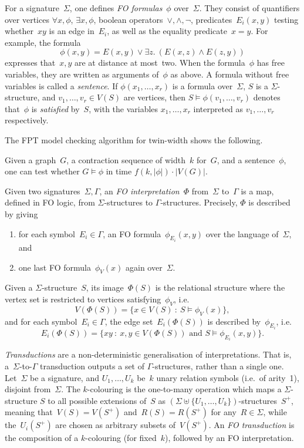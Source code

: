 \documentclass[a4paper,UKenglish,cleveref,thm-restate]{lipics-v2021}
\theoremstyle{remark}
\begin{document}
For a signature~$\Sigma$, one defines \emph{FO formulas}~$\phi$ over~$\Sigma$.
They consist of quantifiers over vertices $\forall x,\phi$, $\exists x,\phi$, boolean operators~$\lor,\land,\lnot$,
predicates~$E_i(x,y)$ testing whether~$xy$ is an edge in~$E_i$, as well as the equality predicate~$x=y$.
For example, the formula
\[ \phi(x,y) = E(x,y) \lor \exists z.\ (E(x,z) \land E(z,y)) \]
expresses that~$x,y$ are at distance at most~two.
When the formula~$\phi$ has free variables, they are written as arguments of~$\phi$ as above.
A formula without free variables is called a \emph{sentence}.
If $\phi(x_1,\dots,x_r)$ is a formula over~$\Sigma$, $S$ is a $\Sigma$-structure, and $v_1,\dots,v_r \in V(S)$ are vertices,
then $S \models \phi(v_1,\dots,v_r)$ denotes that~$\phi$ is \emph{satisfied} by~$S$, with the variables $x_1,\dots,x_r$ interpreted as $v_1,\dots,v_r$ respectively.

The FPT model checking algorithm for twin-width shows the following.
\begin{theorem}\label{thm:model-checking}
    Given a graph~$G$, a contraction sequence of width~$k$ for~$G$, and a sentence~$\phi$,
    one can test whether $G \models \phi$ in time $f(k,|\phi|) \cdot |V(G)|$.
\end{theorem}

Given two signatures~$\Sigma,\Gamma$, an \emph{FO interpretation}~$\Phi$ from~$\Sigma$ to~$\Gamma$
is a map, defined in FO logic, from $\Sigma$-structures to $\Gamma$-structures.
Precisely, $\Phi$ is described by giving
\begin{enumerate}
    \item for each symbol~$E_i \in \Gamma$, an FO formula~$\phi_{E_i}(x,y)$ over the language of~$\Sigma$, and
    \item one last FO formula~$\phi_V(x)$ again over~$\Sigma$.
\end{enumerate} 
Given a $\Sigma$-structure~$S$, its image~$\Phi(S)$ is the relational structure where the vertex set is restricted to vertices satisfying~$\phi_V$, i.e.\
\[ V(\Phi(S)) = \{x \in V(S) \ : \ S \models \phi_V(x) \}, \]
and for each symbol~$E_i \in \Gamma$, the edge set~$E_i(\Phi(S))$ is described by~$\phi_{E_i}$, i.e.\
\[ E_i(\Phi(S)) = \{xy \ : \ x,y \in V(\Phi(S)) \text{ and } S \models \phi_{E_i}(x,y) \}. \]

\emph{Transductions} are a non-deterministic generalisation of interpretations.
That is, a~$\Sigma$-to-$\Gamma$ transduction outputs a set of $\Gamma$-structures, rather than a single one.
Let~$\Sigma$ be a signature, and $U_1,\dots,U_k$ be~$k$ unary relation symbols (i.e.\ of arity~1), disjoint from~$\Sigma$.
The $k$-colouring is the one-to-many operation which maps a $\Sigma$-structure $S$
to all possible extensions of~$S$ as $(\Sigma \uplus \{U_1,\dots,U_k\})$-structures~$S^+$,
meaning that~$V(S) = V(S^+)$ and~$R(S) = R(S^+)$ for any~$R \in \Sigma$,
while the~$U_i(S^+)$ are chosen as arbitrary subsets of~$V(S^+)$.
An \emph{FO transduction} is the composition of a $k$-colouring (for fixed~$k$), followed by an FO interpretation.
\end{document}

